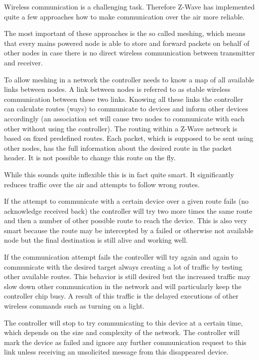 Wireless communication is a challenging task. Therefore Z-Wave has implemented quite a few approaches how to make communication over the air more reliable.

The most important of these approaches is the so called meshing, which means that every mains powered node is able to store and forward packets on behalf
 of other nodes in case there is no direct wireless communication between transmitter and receiver.

To allow meshing in a network the controller needs to know a map of all available links between nodes. A link between nodes is referred to as stable wireless 
 communication between these two links. Knowing all these links the controller can calculate routes (ways) to communicate to devices and inform other devices 
 accordingly (an association set will cause two nodes to communicate with each other without using the controller). 
The routing within a Z-Wave network is based on fixed predefined routes. Each packet, which is supposed to be sent using other nodes, has the full information 
 about the desired route in the packet header. It is not possible to change this route on the fly.

While this sounds quite inflexible this is in fact quite smart. It significantly reduces traffic over the air and attempts to follow wrong routes.  

If the attempt to communicate with a certain device over a given route fails (no acknowledge received back) the controller will try two more times the same route 
 and then a number of other possible route to reach the device. This is also very smart because the route may be intercepted by a failed or otherwise not available 
 node but the final destination is still alive and working well.

If the communication attempt fails the controller will try again and again to communicate with the desired target always creating a lot of traffic 
by testing other available routes.  This behavior is still desired but the increased traffic may slow down other communication in the network and will particularly keep the 
 controller chip busy. A result of this traffic is the delayed executions of other wireless commands such as turning on a light.

The controller will stop to try communicating to this device at a certain time, which depends on the size and complexity of the network. The controller will mark 
 the device as failed and ignore any further communication request to this link unless receiving an unsolicited message from this disappeared device.

